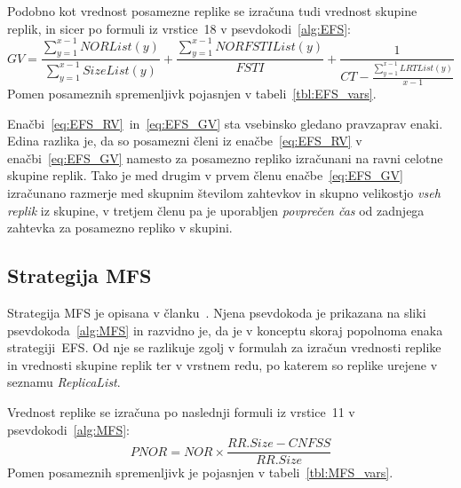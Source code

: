 \documentclass[a4paper, 12pt]{book}
\begin{document}
\begin{samepage}
Podobno kot vrednost posamezne replike se izračuna tudi vrednost skupine
replik, in sicer po formuli iz vrstice~18 v psevdokodi~\ref{alg:EFS}:
\begin{equation}
  \mathit{GV} = \frac{\sum\limits_{y=1}^{x-1} \mathit{NORList(y)}}{
                      \sum\limits_{y=1}^{x-1} \mathit{SizeList(y)}} +
                \frac{\sum\limits_{y=1}^{x-1} \mathit{NORFSTIList(y)}}{
                      \mathit{FSTI}} +
                \frac{1}{\mathit{CT} - \frac{\sum\limits_{y=1}^{x-1}
                         \mathit{LRTList(y)}}{x-1}}
  \label{eq:EFS_GV}
\end{equation}
Pomen posameznih spremenljivk pojasnjen v tabeli~\ref{tbl:EFS_vars}.
\end{samepage}
\vspace{0.5em}

Enačbi~\eqref{eq:EFS_RV}~in~\eqref{eq:EFS_GV} sta vsebinsko gledano
pravzaprav enaki. Edina razlika je, da so posamezni členi iz
enačbe~\eqref{eq:EFS_RV} v enačbi~\eqref{eq:EFS_GV} namesto za posamezno
repliko izračunani na ravni celotne skupine replik.
Tako je med drugim v prvem členu enačbe~\eqref{eq:EFS_GV} izračunano razmerje
med skupnim številom zahtevkov in skupno velikostjo \textit{vseh replik} iz
skupine, v tretjem členu pa je uporabljen \textit{povprečen čas} od zadnjega
zahtevka za posamezno repliko v skupini.


\subsection{Strategija MFS}

Strategija MFS je opisana v članku~\cite{mfs2012}. Njena
psevdokoda je prikazana na sliki psevdokoda~\ref{alg:MFS} in razvidno je,
da je v konceptu skoraj popolnoma enaka strategiji~EFS. Od nje se razlikuje
zgolj v formulah za izračun vrednosti replike in vrednosti skupine replik
ter v vrstnem redu, po katerem so replike urejene v seznamu
\textit{ReplicaList}.

\begin{samepage}
Vrednost replike se izračuna po naslednji formuli iz vrstice~11
v psevdokodi~\ref{alg:MFS}:
\begin{equation}
  \mathit{PNOR} = \mathit{NOR} \times
                  \frac{\mathit{RR.Size} - \mathit{CNFSS}}{
                        \mathit{ RR.Size}}
  \label{eq:MFS_RV}
\end{equation}
Pomen posameznih spremenljivk je pojasnjen v tabeli~\ref{tbl:MFS_vars}.
\end{samepage}
\vspace{1em}
\end{document}
